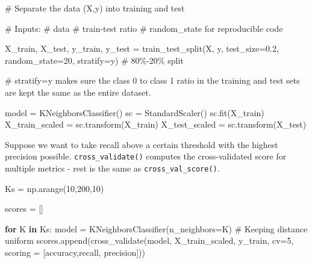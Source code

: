 \documentclass[
  letterpaper,
  DIV=11,
  numbers=noendperiod]{scrreprt}
\newenvironment{Shaded}{\begin{snugshade}}{\end{snugshade}}
\newcommand{\CommentTok}[1]{\textcolor[rgb]{0.37,0.37,0.37}{#1}}
\newcommand{\ControlFlowTok}[1]{\textcolor[rgb]{0.00,0.23,0.31}{\textbf{#1}}}
\newcommand{\DecValTok}[1]{\textcolor[rgb]{0.68,0.00,0.00}{#1}}
\newcommand{\FloatTok}[1]{\textcolor[rgb]{0.68,0.00,0.00}{#1}}
\newcommand{\KeywordTok}[1]{\textcolor[rgb]{0.00,0.23,0.31}{\textbf{#1}}}
\newcommand{\NormalTok}[1]{\textcolor[rgb]{0.00,0.23,0.31}{#1}}
\newcommand{\OperatorTok}[1]{\textcolor[rgb]{0.37,0.37,0.37}{#1}}
\newcommand{\StringTok}[1]{\textcolor[rgb]{0.13,0.47,0.30}{#1}}
\begin{document}
\begin{Shaded}
\begin{Highlighting}[]
\CommentTok{\# Separate the data (X,y) into training and test}

\CommentTok{\# Inputs:}
    \CommentTok{\# data}
    \CommentTok{\# train{-}test ratio}
    \CommentTok{\# random\_state for reproducible code}
    
\NormalTok{X\_train, X\_test, y\_train, y\_test }\OperatorTok{=}\NormalTok{ train\_test\_split(X, y, test\_size}\OperatorTok{=}\FloatTok{0.2}\NormalTok{, random\_state}\OperatorTok{=}\DecValTok{20}\NormalTok{, stratify}\OperatorTok{=}\NormalTok{y) }\CommentTok{\# 80\%{-}20\% split}

\CommentTok{\# stratify=y makes sure the class 0 to class 1 ratio in the training and test sets are kept the same as the entire dataset.}
\end{Highlighting}
\end{Shaded}

\begin{Shaded}
\begin{Highlighting}[]
\NormalTok{model }\OperatorTok{=}\NormalTok{ KNeighborsClassifier() }
\NormalTok{sc }\OperatorTok{=}\NormalTok{ StandardScaler()}
\NormalTok{sc.fit(X\_train)}
\NormalTok{X\_train\_scaled }\OperatorTok{=}\NormalTok{ sc.transform(X\_train)}
\NormalTok{X\_test\_scaled }\OperatorTok{=}\NormalTok{ sc.transform(X\_test)}
\end{Highlighting}
\end{Shaded}

Suppose we want to take recall above a certain threshold with the
highest precision possible. \texttt{cross\_validate()} computes the
cross-validated score for multiple metrics - rest is the same as
\texttt{cross\_val\_score()}.

\begin{Shaded}
\begin{Highlighting}[]
\NormalTok{Ks }\OperatorTok{=}\NormalTok{ np.arange(}\DecValTok{10}\NormalTok{,}\DecValTok{200}\NormalTok{,}\DecValTok{10}\NormalTok{)}

\NormalTok{scores }\OperatorTok{=}\NormalTok{ []}

\ControlFlowTok{for}\NormalTok{ K }\KeywordTok{in}\NormalTok{ Ks:}
\NormalTok{    model }\OperatorTok{=}\NormalTok{ KNeighborsClassifier(n\_neighbors}\OperatorTok{=}\NormalTok{K) }\CommentTok{\# Keeping distance uniform}
\NormalTok{    scores.append(cross\_validate(model, X\_train\_scaled, y\_train, cv}\OperatorTok{=}\DecValTok{5}\NormalTok{, scoring }\OperatorTok{=}\NormalTok{ [}\StringTok{\textquotesingle{}accuracy\textquotesingle{}}\NormalTok{,}\StringTok{\textquotesingle{}recall\textquotesingle{}}\NormalTok{, }\StringTok{\textquotesingle{}precision\textquotesingle{}}\NormalTok{]))}
\end{Highlighting}
\end{Shaded}
\end{document}
